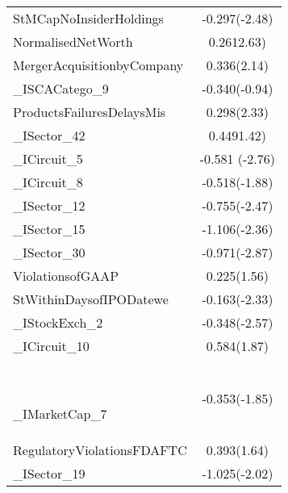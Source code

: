 \begin{table}[H]
\begin{tabular}{l*{1}{c}}
StMCapNoInsiderHoldings&      -0.297(-2.48)\\
                   
NormalisedNetWorth  &       0.2612.63)\\
                  
MergerAcquisitionbyCompany&       0.336(2.14)\\
                 
\_ISCACatego\_9       &      -0.340(-0.94)\\
                   
ProductsFailuresDelaysMis&       0.298(2.33)\\
                 
\_ISector\_42         &       0.4491.42)\\
                    
\_ICircuit\_5         &      -0.581 (-2.76)\\
                    
\_ICircuit\_8         &      -0.518(-1.88)\\
                    
\_ISector\_12         &      -0.755(-2.47)\\
                   
\_ISector\_15         &      -1.106(-2.36)\\
                   
\_ISector\_30         &      -0.971(-2.87)\\
                    
ViolationsofGAAP    &       0.225(1.56)\\
                   
StWithinDaysofIPODatewe&      -0.163(-2.33)\\
                   
\_IStockExch\_2       &      -0.348(-2.57)\\
                    
\_ICircuit\_10        &       0.584(1.87)\\\
                    
\_IMarketCap\_7       &      -0.353(-1.85)\\
                    
RegulatoryViolationsFDAFTC&       0.393(1.64)\\
                  
\_ISector\_19         &      -1.025(-2.02)\\
                    

\end{tabular}
\end{table}
